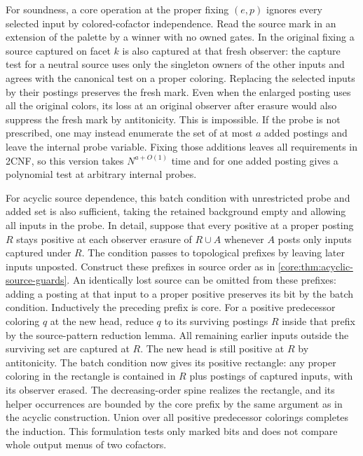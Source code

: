 For soundness, a core operation at the proper fixing
$(e,p)$ ignores every selected input by colored-cofactor
independence. Read the source mark in an extension of
the palette by a winner with no owned gates. In the
original fixing a source captured on facet $k$ is
also captured at that fresh observer: the capture
test for a neutral source uses only the singleton
owners of the other inputs and agrees with the
canonical test on a proper coloring. Replacing the
selected inputs by their postings preserves the fresh
mark. Even when the enlarged posting uses all the
original colors, its loss at an original observer
after erasure would also suppress the fresh mark by
antitonicity. This is impossible. If the probe is not
prescribed, one may instead enumerate the set of at
most $a$ added postings and leave the internal probe
variable. Fixing those additions leaves all
requirements in 2CNF, so this version takes
$N^{a+O(1)}$ time and for one added posting gives a
polynomial test at arbitrary internal probes.

For acyclic source dependence, this batch condition
with unrestricted probe and added set is also
sufficient, taking the retained background empty
and allowing all inputs in the probe. In detail,
suppose that every positive at a proper posting $R$
stays positive at each observer erasure of
$R\cup A$ whenever $A$ posts only inputs captured
under $R$. The condition passes to topological
prefixes by leaving later inputs unposted. Construct
these prefixes in source order as in
\cref{core:thm:acyclic-source-guards}.
An identically lost source can be omitted from these
prefixes: adding a posting at that input to a proper
positive preserves its bit by the batch condition.
Inductively the preceding prefix is core. For a
positive predecessor coloring $q$ at the new head,
reduce $q$ to its surviving postings $R$ inside that
prefix by the source-pattern reduction lemma. All
remaining earlier inputs outside the surviving set
are captured at $R$. The new head is still positive
at $R$ by antitonicity. The batch condition now gives
its positive rectangle: any proper coloring in the
rectangle is contained in $R$ plus postings of
captured inputs, with its observer erased.
The decreasing-order spine realizes the rectangle,
and its helper occurrences are bounded by the core
prefix by the same argument as in the acyclic
construction. Union over all positive predecessor
colorings completes the induction. This formulation
tests only marked bits and does not compare whole
output menus of two cofactors.

